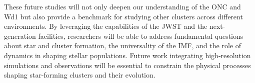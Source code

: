 \documentclass[12pt]{ucsddissertation}
\begin{document}
\begin{CJK*}{UTF8}{gbsn}
These future studies will not only deepen our understanding of the ONC and Wd1 but also provide a benchmark for studying other clusters across different environments. By leveraging the capabilities of the JWST and the next-generation facilities, researchers will be able to address fundamental questions about star and cluster formation, the universality of the IMF, and the role of dynamics in shaping stellar populations. Future work integrating high-resolution simulations and observations will be essential to constrain the physical processes shaping star-forming clusters and their evolution.



\backmatter


\end{CJK*}
\end{document}
